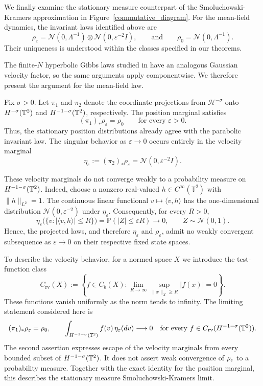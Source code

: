We finally examine the stationary measure counterpart of the Smoluchowski-Kramers approximation in Figure~\ref{commutative_diagram}.
For the mean-field dynamics, the invariant laws identified above are
\[
    \rho_\varepsilon
    =
    \mathcal{N}(0,\Lambda^{-1})
    \otimes
    \mathcal{N}(0,\varepsilon^{-2}I),
    \qquad \text{and} \qquad
    \rho_0=\mathcal{N}(0,\Lambda^{-1}).
\]
Their uniqueness is understood within the classes specified in our theorems. 

The finite-$N$ hyperbolic Gibbs laws studied in \cite{liu2025} have an analogous Gaussian velocity factor, so the same arguments apply componentwise. We therefore present the argument for the mean-field law.

Fix $\sigma > 0$. Let $\pi_1$ and $\pi_2$ denote the coordinate projections
from $\mathcal{H}^{-\sigma}$ onto $H^{-\sigma}(\mathbb{T}^2)$ and $H^{-1-\sigma}(\mathbb{T}^2)$, respectively.
The position marginal satisfies
\[
    (\pi_1)_*\rho_\varepsilon=\rho_0
    \qquad\text{for every }\varepsilon>0.
\]
Thus, the stationary position distributions already agree with the parabolic invariant law. The singular behavior as $\varepsilon\to0$ occurs entirely in the velocity marginal
\[
    \eta_\varepsilon
    :=(\pi_2)_*\rho_\varepsilon
    =\mathcal{N}(0,\varepsilon^{-2}I).
\]

These velocity marginals do not converge weakly to a probability measure on $H^{-1-\sigma}(\mathbb{T}^2)$.
Indeed, choose a nonzero real-valued
$h\in C^\infty(\mathbb{T}^2)$ with $\|h\|_{L^2}=1$.
The continuous linear functional $v\mapsto\langle v,h\rangle$ has the one-dimensional distribution $\mathcal{N}(0,\varepsilon^{-2})$ under $\eta_\varepsilon$. Consequently, for every $R>0$,
\[
    \eta_\varepsilon
    \bigl(\{v:|\langle v,h\rangle|\leq R\}\bigr)
    =
    \mathbb{P}(|Z|\leq\varepsilon R)
    \longrightarrow0,
    \qquad Z\sim\mathcal{N}(0,1).
\]
Hence, the projected laws, and therefore $\eta_\varepsilon$ and $\rho_\varepsilon$, admit no weakly convergent subsequence as $\varepsilon\to0$ on their respective fixed state spaces.

To describe the velocity behavior, for a normed space $X$ we introduce the test-function class
\[
    C_{\mathrm{rv}}(X)
    :=
    \left\{
        f\in C_b(X):
        \lim_{R\to\infty}
        \sup_{\|x\|_X\geq R}|f(x)|=0
    \right\}.
\]
These functions vanish uniformly as the norm tends to infinity. The limiting statement considered here is
\begin{equation}\label{eq:stationary_SKA_marginals}
    (\pi_1)_*\rho_\varepsilon=\rho_0,
    \qquad
    \int_{H^{-1-\sigma}(\mathbb{T}^2)}f(v)\,\eta_\varepsilon(dv)
    \longrightarrow0
    \quad
    \text{for every }f\in C_{\mathrm{rv}}(H^{-1-\sigma}(\mathbb{T}^2)).
\end{equation}
The second assertion expresses escape of the velocity marginals from every bounded subset of $H^{-1-\sigma}(\mathbb{T}^2)$.
It does not assert weak convergence of $\rho_\varepsilon$ to a probability measure.
Together with the exact identity for the position marginal, this describes the stationary measure Smoluchowski-Kramers limit.

